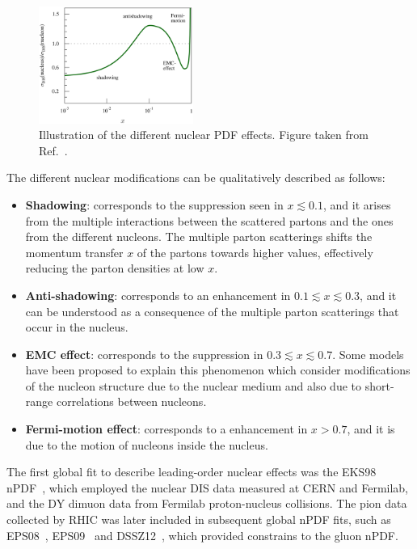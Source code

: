 \begin{figure}[!htb]
 \centering
 \includegraphics[width=0.45\textwidth]{Figures/WBoson/Theory/NuclearPDF.png}
 \caption{Illustration of the different nuclear PDF effects. Figure taken from Ref.~\cite{NuclearPDFIllus}.}
 \label{fig:NuclearPDFs}
\end{figure}

The different nuclear modifications can be qualitatively described as follows:

\begin{itemize}
 \item \textbf{Shadowing}: corresponds to the suppression seen in $x \lesssim 0.1$, and it arises from the multiple interactions between the scattered partons and the ones from the different nucleons. The multiple parton scatterings shifts the momentum transfer $x$ of the partons towards higher values, effectively reducing the parton densities at low $x$.
 \item \textbf{Anti-shadowing}: corresponds to an enhancement in $0.1 \lesssim x \lesssim 0.3$, and it can be understood as a consequence of the multiple parton scatterings that occur in the nucleus.
 \item \textbf{EMC effect}: corresponds to the suppression in $0.3 \lesssim x \lesssim 0.7$. Some models have been proposed to explain this phenomenon which consider modifications of the nucleon structure due to the nuclear medium and also due to short-range correlations between nucleons.
 \item \textbf{Fermi-motion effect}: corresponds to a enhancement in $x > 0.7$, and it is due to the motion of nucleons inside the nucleus.
\end{itemize}

The first global fit to describe leading-order nuclear effects was the EKS98 nPDF~\cite{EKS98}, which employed the nuclear DIS data measured at CERN and Fermilab, and the DY dimuon data from Fermilab proton-nucleus collisions. The pion data collected by RHIC was later included in subsequent global nPDF fits, such as EPS08~\cite{EPS08}, EPS09~\cite{EPS09} and DSSZ12~\cite{DSSZ12}, which provided constrains to the gluon nPDF.

